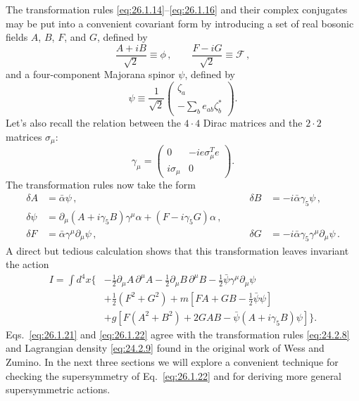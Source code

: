 The transformation rules \eqref{eq:26.1.14}--\eqref{eq:26.1.16} and their
complex conjugates may be put into a convenient covariant form by introducing
a set of real bosonic fields \(A\), \(B\), \(F\), and \(G\), defined by
\begin{equation}
  \frac{A+iB}{\sqrt{2}}\equiv\phi\,,
  \qquad
  \frac{F-iG}{\sqrt{2}}\equiv\mathcal{F}\,,
  \tag{26.1.19}\label{eq:26.1.19}
\end{equation}
and a four-component Majorana spinor \(\psi\), defined by
\begin{equation}
  \psi\equiv\frac{1}{\sqrt{2}}
  \begin{pmatrix}
    \zeta_a\\
    \displaystyle-\sum_b e_{ab}\zeta_b^*
  \end{pmatrix}.
  \tag{26.1.20}\label{eq:26.1.20}
\end{equation}
Let's also recall the relation between the \(4\cdot4\) Dirac matrices and the
\(2\cdot2\) matrices \(\sigma_\mu\):
\[
  \gamma_\mu=
  \begin{pmatrix}
    0&-ie\sigma_\mu^T e\\
    i\sigma_\mu&0
  \end{pmatrix}.
\]
The transformation rules now take the form
\begin{equation}
  \begin{aligned}
    \delta A&=\bar{\alpha}\psi\,,
    &\qquad
    \delta B&=-i\bar{\alpha}\gamma_5\psi\,,
    \\
    \delta\psi
    &=\partial_\mu(A+i\gamma_5B)\gamma^\mu\alpha
      +(F-i\gamma_5G)\alpha\,,
    \\
    \delta F&=\bar{\alpha}\gamma^\mu\partial_\mu\psi\,,
    &\qquad
    \delta G&=-i\bar{\alpha}\gamma_5\gamma^\mu\partial_\mu\psi\,.
  \end{aligned}
  \tag{26.1.21}\label{eq:26.1.21}
\end{equation}
A direct but tedious calculation shows that this transformation leaves
invariant the action
\begin{equation}
  \begin{aligned}
  I=\int d^4x\biggl\{
    &-\frac12\partial_\mu A\,\partial^\mu A
     -\frac12\partial_\mu B\,\partial^\mu B
     -\frac12\bar{\psi}\gamma^\mu\partial_\mu\psi
  \\
    &+\frac12(F^2+G^2)
     +m\left[FA+GB-\frac12\bar{\psi}\psi\right]
  \\
    &+g\left[F(A^2+B^2)+2GAB
      -\bar{\psi}(A+i\gamma_5B)\psi\right]\biggr\}.
  \end{aligned}
  \tag{26.1.22}\label{eq:26.1.22}
\end{equation}
Eqs.~\eqref{eq:26.1.21} and \eqref{eq:26.1.22} agree with the transformation
rules \eqref{eq:24.2.8} and Lagrangian density \eqref{eq:24.2.9} found in the
original work of Wess and Zumino. In the next three sections we will explore a
convenient technique for checking the supersymmetry of
Eq.~\eqref{eq:26.1.22} and for deriving more general supersymmetric actions.

